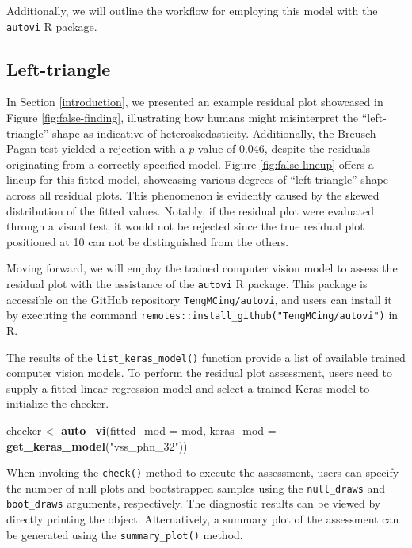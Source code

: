 \documentclass[]{interact}
\theoremstyle{plain}%
\theoremstyle{definition}
\theoremstyle{remark}
\newenvironment{Shaded}{\begin{snugshade}}{\end{snugshade}}
\newcommand{\AttributeTok}[1]{\textcolor[rgb]{0.13,0.29,0.53}{#1}}
\newcommand{\FunctionTok}[1]{\textcolor[rgb]{0.13,0.29,0.53}{\textbf{#1}}}
\newcommand{\NormalTok}[1]{#1}
\newcommand{\OtherTok}[1]{\textcolor[rgb]{0.56,0.35,0.01}{#1}}
\newcommand{\StringTok}[1]{\textcolor[rgb]{0.31,0.60,0.02}{#1}}
\begin{document}
Additionally, we will outline the workflow for employing this model with
the \texttt{autovi} R package.

\subsection{Left-triangle}\label{left-triangle}

In Section \ref{introduction}, we presented an example residual plot
showcased in Figure \ref{fig:false-finding}, illustrating how humans
might misinterpret the ``left-triangle'' shape as indicative of
heteroskedasticity. Additionally, the Breusch-Pagan test yielded a
rejection with a \(p\)-value of 0.046, despite the residuals originating
from a correctly specified model. Figure \ref{fig:false-lineup} offers a
lineup for this fitted model, showcasing various degrees of
``left-triangle'' shape across all residual plots. This phenomenon is
evidently caused by the skewed distribution of the fitted values.
Notably, if the residual plot were evaluated through a visual test, it
would not be rejected since the true residual plot positioned at 10 can
not be distinguished from the others.

Moving forward, we will employ the trained computer vision model to
assess the residual plot with the assistance of the \texttt{autovi} R
package. This package is accessible on the GitHub repository
\texttt{TengMCing/autovi}, and users can install it by executing the
command \texttt{remotes::install\_github("TengMCing/autovi")} in R.

The results of the \texttt{list\_keras\_model()} function provide a list
of available trained computer vision models. To perform the residual
plot assessment, users need to supply a fitted linear regression model
and select a trained Keras model to initialize the checker.

\begin{Shaded}
\begin{Highlighting}[]
\NormalTok{checker }\OtherTok{\textless{}{-}} \FunctionTok{auto\_vi}\NormalTok{(}\AttributeTok{fitted\_mod =}\NormalTok{ mod, }
                   \AttributeTok{keras\_mod =} \FunctionTok{get\_keras\_model}\NormalTok{(}\StringTok{"vss\_phn\_32"}\NormalTok{))}
\end{Highlighting}
\end{Shaded}

When invoking the \texttt{check()} method to execute the assessment,
users can specify the number of null plots and bootstrapped samples
using the \texttt{null\_draws} and \texttt{boot\_draws} arguments,
respectively. The diagnostic results can be viewed by directly printing
the object. Alternatively, a summary plot of the assessment can be
generated using the \texttt{summary\_plot()} method.
\end{document}
